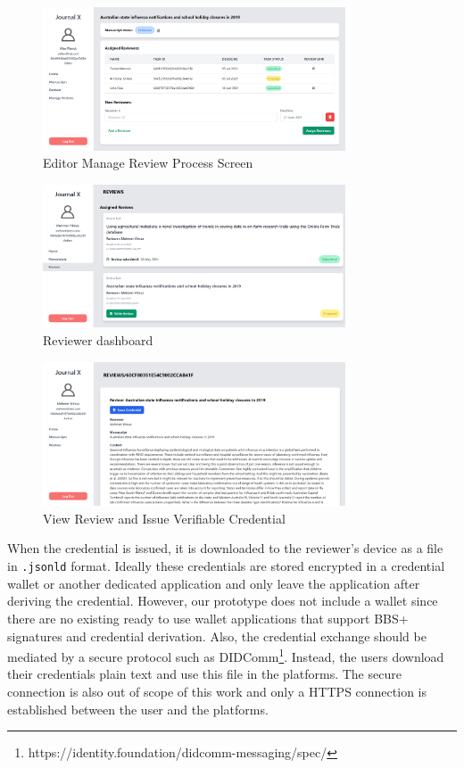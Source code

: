 \begin{figure}[htpb]
  \centering
  \includegraphics[width=0.8\textwidth]{figures/editor.png}
  \caption{Editor Manage Review Process Screen} \label{fig:editor}
\end{figure}

\begin{figure}[htpb]
  \centering
  \includegraphics[width=0.8\textwidth]{figures/reviewerScreen.png}
  \caption{Reviewer dashboard} \label{fig:reviewer-screen}
\end{figure}

\begin{figure}[htpb]
  \centering
  \includegraphics[width=0.8\textwidth]{figures/viewReview.png}
  \caption{View Review and Issue Verifiable Credential} \label{fig:view-review}
\end{figure}

When the credential is issued, it is downloaded to the reviewer's device as a file in \lstinline{.jsonld} format. Ideally these credentials are stored encrypted in a credential wallet or another dedicated application and only leave the application after deriving the credential. However, our prototype does not include a wallet since there are no existing ready to use wallet applications that support BBS+ signatures and credential derivation. Also, the credential exchange should be mediated by a secure protocol such as DIDComm\footnote{https://identity.foundation/didcomm-messaging/spec/}.  Instead, the users download their credentials plain text and use this file in the platforms. The secure connection is also out of scope of this work and only a HTTPS connection is established between the user and the platforms.

